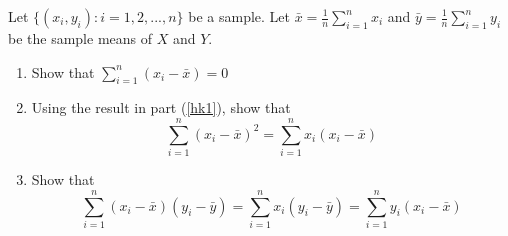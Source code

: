 \begin{problem}
  Let $\{(x_i,y_i): i=1,2,...,n\}$ be a sample. Let $\bar{x}
  = \frac{1}{n} \sum_{i=1}^n x_i$ and $\bar{y} = \frac{1}{n} 
  \sum_{i=1}^n y_i$ be the sample means of $X$ and $Y$.
  \begin{enumerate}
  \item\label{hk1} Show that $\sum_{i=1}^n (x_i - \bar{x}) = 0$
  \item Using the result in part (\ref{hk1}), show that 
    \[ \sum_{i=1}^n (x_i - \bar{x})^2 = \sum_{i=1}^n x_i (x_i -
    \bar{x}) \]
  \item Show that
    \[ \sum_{i=1}^n (x_i - \bar{x}) (y_i - \bar{y}) = \sum_{i=1}^n x_i
    (y_i - \bar{y}) = \sum_{i=1}^n y_i (x_i - \bar{x}) \]
  \end{enumerate}
\end{problem}








